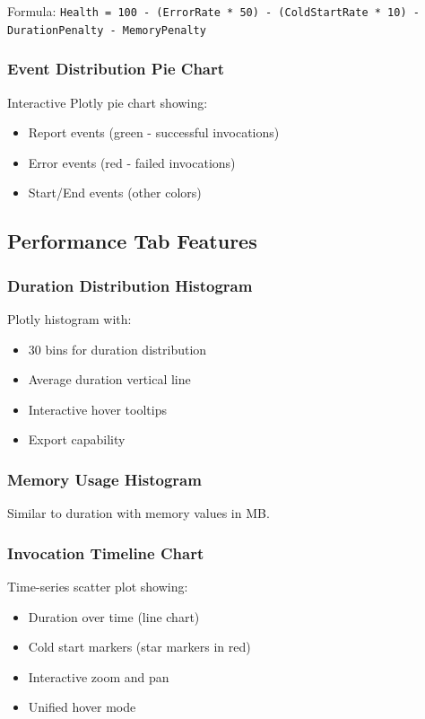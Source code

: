 \documentclass[12pt,a4paper]{article}
\begin{document}
Formula: \texttt{Health = 100 - (ErrorRate * 50) - (ColdStartRate * 10) - DurationPenalty - MemoryPenalty}

\subsubsection{Event Distribution Pie Chart}
Interactive Plotly pie chart showing:
\begin{itemize}
    \item Report events (green - successful invocations)
    \item Error events (red - failed invocations)
    \item Start/End events (other colors)
\end{itemize}

\subsection{Performance Tab Features}

\subsubsection{Duration Distribution Histogram}
Plotly histogram with:
\begin{itemize}
    \item 30 bins for duration distribution
    \item Average duration vertical line
    \item Interactive hover tooltips
    \item Export capability
\end{itemize}

\subsubsection{Memory Usage Histogram}
Similar to duration with memory values in MB.

\subsubsection{Invocation Timeline Chart}
Time-series scatter plot showing:
\begin{itemize}
    \item Duration over time (line chart)
    \item Cold start markers (star markers in red)
    \item Interactive zoom and pan
    \item Unified hover mode
\end{itemize}
\end{document}
